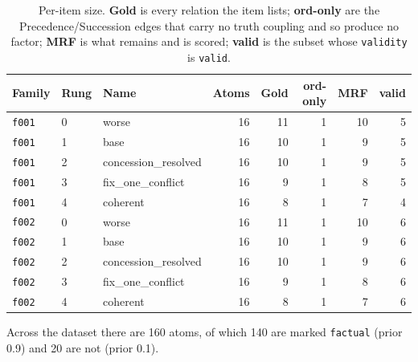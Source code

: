 \documentclass[11pt]{article}
\begin{document}
\begin{table}[htbp]
\centering
\small
\caption{Per-item size. \textbf{Gold} is every relation the item lists; \textbf{ord-only} are the Precedence/Succession edges that carry no truth coupling and so produce no factor; \textbf{MRF} is what remains and is scored; \textbf{valid} is the subset whose \texttt{validity} is \texttt{valid}.}
\label{tab:dataset}
\begin{tabular}{lllrrrrr}
\toprule
Family & Rung & Name & Atoms & Gold & ord-only & MRF & valid \\
\midrule
\texttt{f001} & 0 & worse & 16 & 11 & 1 & 10 & 5 \\
\texttt{f001} & 1 & base & 16 & 10 & 1 & 9 & 5 \\
\texttt{f001} & 2 & concession\_resolved & 16 & 10 & 1 & 9 & 5 \\
\texttt{f001} & 3 & fix\_one\_conflict & 16 & 9 & 1 & 8 & 5 \\
\texttt{f001} & 4 & coherent & 16 & 8 & 1 & 7 & 4 \\
\texttt{f002} & 0 & worse & 16 & 11 & 1 & 10 & 6 \\
\texttt{f002} & 1 & base & 16 & 10 & 1 & 9 & 6 \\
\texttt{f002} & 2 & concession\_resolved & 16 & 10 & 1 & 9 & 6 \\
\texttt{f002} & 3 & fix\_one\_conflict & 16 & 9 & 1 & 8 & 6 \\
\texttt{f002} & 4 & coherent & 16 & 8 & 1 & 7 & 6 \\
\bottomrule
\end{tabular}
\end{table}

Across the dataset there are 160 atoms, of which 140 are marked \texttt{factual} (prior 0.9) and 20 are not (prior 0.1).
\end{document}
